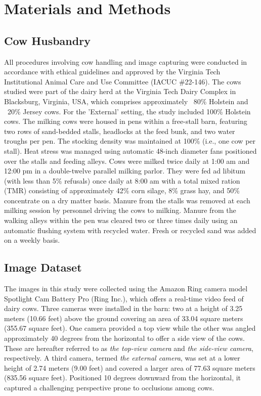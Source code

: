 \section{Materials and Methods}

\subsection*{Cow Husbandry}

All procedures involving cow handling and image capturing were conducted in accordance with ethical guidelines and approved by the Virginia Tech Institutional Animal Care and Use Committee (IACUC \#22-146). The cows studied were part of the dairy herd at the Virginia Tech Dairy Complex in Blacksburg, Virginia, USA, which comprises approximately ~80\% Holstein and ~20\% Jersey cows. For the 'External' setting, the study included  100\% Holstein cows. The milking cows were housed in pens within a free-stall barn, featuring two rows of sand-bedded stalls, headlocks at the feed bunk, and two water troughs per pen. The stocking density was maintained at 100\% (i.e., one cow per stall). Heat stress was managed using automatic 48-inch diameter fans positioned over the stalls and feeding alleys. Cows were milked twice daily at 1:00 am and 12:00 pm in a double-twelve parallel milking parlor. They were fed ad libitum (with less than 5\% refusals) once daily at 8:00 am with a total mixed ration (TMR) consisting of approximately 42\% corn silage, 8\% grass hay, and 50\% concentrate on a dry matter basis. Manure from the stalls was removed at each milking session by personnel driving the cows to milking. Manure from the walking alleys within the pen was cleared two or three times daily using an automatic flushing system with recycled water. Fresh or recycled sand was added on a weekly basis.

\subsection*{Image Dataset}

The images in this study were collected using the Amazon Ring camera model Spotlight Cam Battery Pro (Ring Inc.), which offers a real-time video feed of dairy cows. Three cameras were installed in the barn: two at a height of 3.25 meters (10.66 feet) above the ground covering an area of 33.04 square meters (355.67 square feet). One camera provided a top view while the other was angled approximately 40 degrees from the horizontal to offer a side view of the cows. These are hereafter referred to as \textit{the top-view camera} and \textit{the side-view camera}, respectively. A third camera, termed \textit{the external camera}, was set at a lower height of 2.74 meters (9.00 feet) and covered a larger area of 77.63 square meters (835.56 square feet). Positioned 10 degrees downward from the horizontal, it captured a challenging perspective prone to occlusions among cows.

